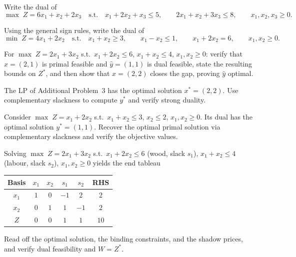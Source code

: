 \begin{problems}
  \item Write the dual of
        \[
          \max\; Z=6x_{1}+x_{2}+2x_{3}
          \quad\text{s.t.}\quad
          x_{1}+2x_{2}+x_{3}\le 5,\qquad
          2x_{1}+x_{2}+3x_{3}\le 8,\qquad
          x_{1},x_{2},x_{3}\ge 0 .
        \]
  \item Using the general sign rules, write the dual of
        \[
          \min\; Z=4x_{1}+2x_{2}
          \quad\text{s.t.}\quad
          x_{1}+x_{2}\ge 3,\qquad
          x_{1}-x_{2}\le 1,\qquad
          x_{1}+2x_{2}= 6,\qquad x_{1},x_{2}\ge 0 .
        \]
  \item For
        $\max\; Z=2x_{1}+3x_{2}$ s.t.\ $x_{1}+2x_{2}\le 6$,
        $x_{1}+x_{2}\le 4$, $x_{1},x_{2}\ge 0$:
        verify that $\hat{x}=(2,1)$ is primal feasible and
        $\hat{y}=(1,1)$ is dual feasible, state the resulting bounds on
        $Z^{*}$, and then show that $x=(2,2)$ closes the gap, proving
        $\hat{y}$ optimal.
  \item The LP of Additional Problem~3 has the optimal solution
        $x^{*}=(2,2)$. Use complementary slackness to compute $y^{*}$ and
        verify strong duality.
  \item Consider
        $\max\; Z=x_{1}+2x_{2}$ s.t.\ $x_{1}+x_{2}\le 3$, $x_{2}\le 2$,
        $x_{1},x_{2}\ge 0$. Its dual has the optimal solution
        $y^{*}=(1,1)$. Recover the optimal primal solution via
        complementary slackness and verify the objective values.
  \item Solving
        $\max\; Z=2x_{1}+3x_{2}$ s.t.\
        $x_{1}+2x_{2}\le 6$ (wood, slack $s_{1}$),
        $x_{1}+x_{2}\le 4$ (labour, slack $s_{2}$),
        $x_{1},x_{2}\ge 0$
        yields the end tableau
        \begin{center}
        \begin{tabular}{c|cccc|c}
          Basis & $x_{1}$ & $x_{2}$ & $s_{1}$ & $s_{2}$ & RHS\\
          \hline
          $x_{1}$ & $1$ & $0$ & $-1$ & $2$  & $2$\\
          $x_{2}$ & $0$ & $1$ & $1$  & $-1$ & $2$\\
          \hline
          $Z$     & $0$ & $0$ & $1$  & $1$  & $10$\\
        \end{tabular}
        \end{center}
        Read off the optimal solution, the binding constraints, and the
        shadow prices, and verify dual feasibility and $W=Z^{*}$.

\end{problems}
